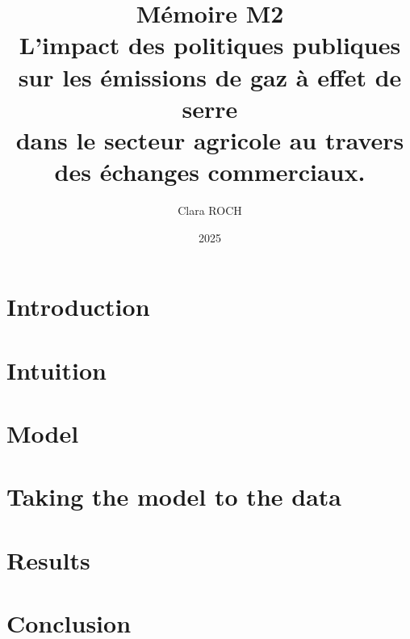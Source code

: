 \documentclass[10pt,twoside]{report}
\title{%
    Mémoire M2 \\
    \large L'impact des politiques publiques sur les émissions de gaz à effet de serre \\ dans le secteur agricole au travers des échanges commerciaux.}
\author{Clara ROCH}
\date{2025}
\begin{document}
\maketitle
\tableofcontents

\chapter{Introduction}


\chapter{Intuition}\label{intuition}


\chapter{Model}\label{model}


\chapter{Taking the model to the data}\label{data}


\chapter{Results}\label{results}


\chapter{Conclusion}


\appendix

\end{document}
